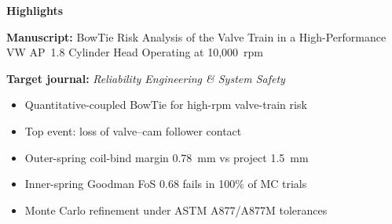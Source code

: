 \documentclass[11pt,a4paper]{article}
\begin{document}
\begin{center}
{\Large\bfseries Highlights\par}
\end{center}

\bigskip

\noindent\textbf{Manuscript:} BowTie Risk Analysis of the Valve Train
in a High-Performance VW AP~1.8 Cylinder Head Operating at
10{,}000~rpm

\noindent\textbf{Target journal:} \emph{Reliability Engineering \&
System Safety}

\bigskip

\begin{itemize}\setlength{\itemsep}{0.4em}
\item Quantitative-coupled BowTie for high-rpm valve-train risk
\item Top event: loss of valve--cam follower contact
\item Outer-spring coil-bind margin 0.78~mm vs project 1.5~mm
\item Inner-spring Goodman FoS 0.68 fails in 100\% of MC trials
\item Monte Carlo refinement under ASTM A877/A877M tolerances
\end{itemize}
\end{document}
